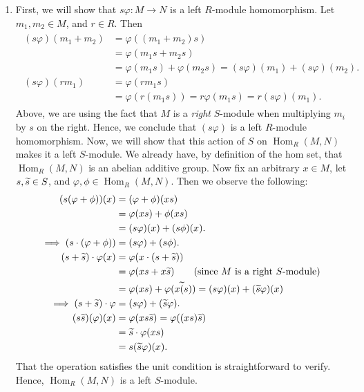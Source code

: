\documentclass{article}
\begin{document}
	\vspace{-0.25cm}
	\begin{enumerate}[itemsep =-2pt,label = (\alph{*})]
		\item First, we will show that $s\varphi: M \to N$ is a left $R$-module homomorphism. Let $m_{1}, m_{2} \in M$, and $r \in R$. Then 
		\begin{align*}
			\begin{split}
				(s\varphi)(m_{1} + m_{2}) &= \varphi((m_{1} + m_{2})s) \\
				&= \varphi(m_{1}s + m_{2}s) \\
				&= \varphi(m_{1}s) + \varphi(m_{2}s) = (s\varphi)(m_{1}) + (s\varphi)(m_{2}). \\
				(s\varphi)(rm_{1}) &= \varphi(rm_{1}s) \\
				&= \varphi(r(m_{1}s)) = r\varphi(m_{1}s) = r(s\varphi)(m_{1}). 
			\end{split}
		\end{align*}
		Above, we are using the fact that $M$ is a \textit{right} $S$-module when multiplying $m_{i}$ by $s$ on the right. Hence, we conclude that $(s\varphi)$ is a left $R$-module homomorphism. Now, we will show that this action of $S$ on $\operatorname{Hom}_{R}(M, N)$ makes it a left $S$-module. We already have, by definition of the hom set, that $\operatorname{Hom}_{R}(M,N)$ is an abelian additive group. Now fix an arbitrary $x \in M$, let $s, \widetilde{s} \in S$, and $\varphi, \phi \in \operatorname{Hom}_{R}(M, N)$. Then we observe the following: 
		\begin{align*}
			\begin{split}
				(s(\varphi + \phi))(x) &= (\varphi + \phi)(xs) \\
				&= \varphi(xs) + \phi(xs) \\
				&= (s\varphi)(x) + (s\phi)(x). \\
				\implies (s \cdot (\varphi + \phi)) &= (s\varphi) + (s\phi). \\
				(s + \widetilde{s}) \cdot \varphi(x) &= \varphi(x\cdot (s + \widetilde{s})) \\
				&= \varphi(xs + x\widetilde{s}) \qquad \text{(since $M$ is a right $S$-module)} \\
				&= \varphi(xs) + \varphi(x\widetilde{(}s)) = (s\varphi)(x) + (\widetilde{s}\varphi)(x) \\
				\implies (s + \widetilde{s}) \cdot \varphi &= (s\varphi) + (\widetilde{s}\varphi). \\
				(s \widetilde{s})(\varphi)(x) &= \varphi(xs\widetilde{s}) = \varphi((xs)\widetilde{s}) \\
				&= \widetilde{s} \cdot \varphi(xs) \\
				&= s(\widetilde{s}\varphi)(x). 
			\end{split}
		\end{align*}
		That the operation satisfies the unit condition is straightforward to verify. Hence, $\operatorname{Hom}_{R}(M, N)$ is a left $S$-module. 
	\end{enumerate}
	
\end{document}
